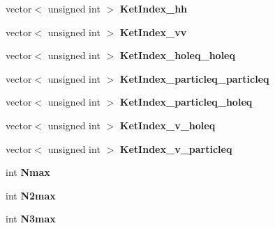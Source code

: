 \begin{DoxyCompactItemize}
\item 
\hypertarget{classModelSpace_a74d9df38e78bf2482e9c3ac4c48131e6}{vector$<$ unsigned int $>$ {\bfseries Ket\-Index\-\_\-hh}}\label{classModelSpace_a74d9df38e78bf2482e9c3ac4c48131e6}

\item 
\hypertarget{classModelSpace_a37e211e60ca5072cb6e4f6fb1099409e}{vector$<$ unsigned int $>$ {\bfseries Ket\-Index\-\_\-vv}}\label{classModelSpace_a37e211e60ca5072cb6e4f6fb1099409e}

\item 
\hypertarget{classModelSpace_aaf880f4d583b138059386793918024e6}{vector$<$ unsigned int $>$ {\bfseries Ket\-Index\-\_\-holeq\-\_\-holeq}}\label{classModelSpace_aaf880f4d583b138059386793918024e6}

\item 
\hypertarget{classModelSpace_ad7703d8b091bd01e87dbaf326d012589}{vector$<$ unsigned int $>$ {\bfseries Ket\-Index\-\_\-particleq\-\_\-particleq}}\label{classModelSpace_ad7703d8b091bd01e87dbaf326d012589}

\item 
\hypertarget{classModelSpace_a14d0a2c0eea85d4daedf608f8f3acf55}{vector$<$ unsigned int $>$ {\bfseries Ket\-Index\-\_\-particleq\-\_\-holeq}}\label{classModelSpace_a14d0a2c0eea85d4daedf608f8f3acf55}

\item 
\hypertarget{classModelSpace_a41719e88e36858720a4cdd19468057d2}{vector$<$ unsigned int $>$ {\bfseries Ket\-Index\-\_\-v\-\_\-holeq}}\label{classModelSpace_a41719e88e36858720a4cdd19468057d2}

\item 
\hypertarget{classModelSpace_a7a9b12cf0ddc9393dd06adbb3c04885b}{vector$<$ unsigned int $>$ {\bfseries Ket\-Index\-\_\-v\-\_\-particleq}}\label{classModelSpace_a7a9b12cf0ddc9393dd06adbb3c04885b}

\item 
\hypertarget{classModelSpace_aa049d819d4d18cfb466777581cc349d2}{int {\bfseries Nmax}}\label{classModelSpace_aa049d819d4d18cfb466777581cc349d2}

\item 
\hypertarget{classModelSpace_a60db71713d3964af214756163ba0585e}{int {\bfseries N2max}}\label{classModelSpace_a60db71713d3964af214756163ba0585e}

\item 
\hypertarget{classModelSpace_ab28d5ba1838ef9d91a3f7c570530ca7c}{int {\bfseries N3max}}\label{classModelSpace_ab28d5ba1838ef9d91a3f7c570530ca7c}


\end{DoxyCompactItemize}
